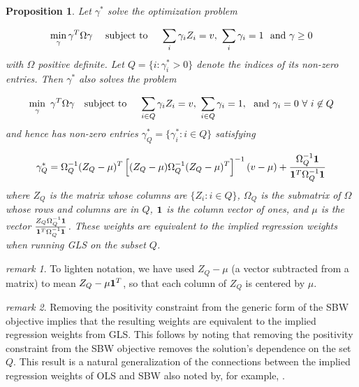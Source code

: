 \documentclass[aoas]{imsart}
\theoremstyle{plain}
\newtheorem{proposition}{Proposition}
\theoremstyle{remark}
\newtheorem{remark}{remark}
\begin{document}
\begin{appendix}
\begin{proposition}\label{cl56}
Let $\gamma^*$ solve the optimization problem

\begin{equation}\label{eqn:a1.1}
 \min_\gamma \gamma^T \Omega \gamma \quad \text{ subject to } \quad  \sum_i \gamma_i Z_i = v,\ \sum_i \gamma_i = 1 \ \textup{ and } \gamma \geq 0%
\end{equation}
with $\Omega$ positive definite. Let $Q = \{i: \gamma^*_i > 0\}$ denote the indices of its non-zero entries. Then $\gamma^*$ also solves the problem
  
  \begin{equation}\label{eqn:a1.2}
   \min_{\gamma}  \ \gamma^T \Omega \gamma  \quad \textup{subject to }\quad \sum_{i \in Q} \gamma_i Z_i = v,\ \sum_{i \in Q} \gamma_i = 1,\ \textup{ and }   \gamma_i = 0\  \forall\ i \not\in Q
  \end{equation}
and hence has non-zero entries $\gamma^*_Q = \{\gamma_i^*: i \in Q\}$ satisfying
 
 \begin{equation}\label{eqn:a1.3}
 \gamma^*_{Q} = \Omega_{Q}^{-1} (Z_{Q} - \mu)^T\left[ (Z_Q - \mu) \Omega_{Q}^{-1} (Z_Q - \mu)^T\right]^{-1} (v - \mu) + \frac{\Omega^{-1}_Q {\bf 1} }{{\bf 1}^T \Omega^{-1}_Q {\bf 1}}
 \end{equation}
where $Z_{Q}$ is the matrix whose columns are $\{Z_i: i \in Q\}$, $\Omega_Q$ is the submatrix of $\Omega$ whose rows and columns are in $Q$, ${\bf 1}$ is the column vector of ones, and $\mu$ is the vector $\frac{Z_{Q}\Omega_{Q}^{-1} {\bf 1}}{ {\bf 1}^T \Omega^{-1}_Q {\bf 1}}$. These weights are equivalent to the implied regression weights when running GLS on the subset $Q$.
\end{proposition}

\begin{remark}
To lighten notation, we have used $Z_Q - \mu$ (a vector subtracted from a matrix) to mean $Z_Q - \mu{\bf 1}^T$, so that each column of $Z_{Q}$ is centered by $\mu$. 
\end{remark}

\begin{remark}
Removing the positivity constraint from the generic form of the SBW objective implies that the resulting weights are equivalent to the implied regression weights from GLS. This follows by noting that removing the positivity constraint from the SBW objective removes the solution's dependence on the set $Q$. This result is a natural generalization of the connections between the implied regression weights of OLS and SBW also noted by, for example, \cite{chattopadhyay2021implied}.
\end{remark}


\end{appendix}
\end{document}
